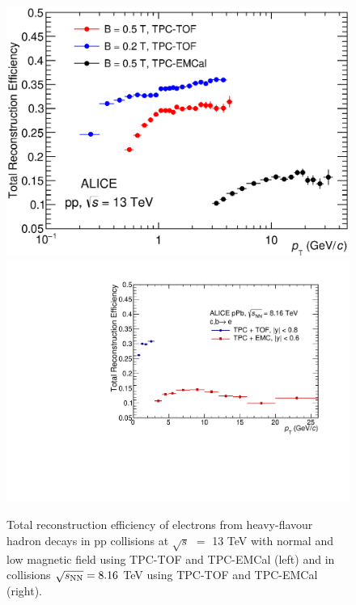 \begin{figure}[!ht]


 \begin{center}
      \includegraphics[width=0.48\linewidth]{figures/Results/HFE_pp_LowB/CompWithNormalB_LowB_logx.eps}
      \includegraphics[width=0.46\linewidth]{figures/Results/HFE_pPb/TotalReconstructionEfficiency.pdf}
      \end{center}

\caption{Total reconstruction efficiency of electrons from heavy-flavour hadron decays in pp collisions at $\sqrt{s}$ $=$ 13 TeV with normal and low magnetic field using TPC-TOF and TPC-EMCal (left) and in \pPb collisions $\sqrt{s_{\rm NN}}=8.16$ TeV using TPC-TOF and TPC-EMCal (right).}        
\label{Fig:ppHFEEff}
\end{figure}


